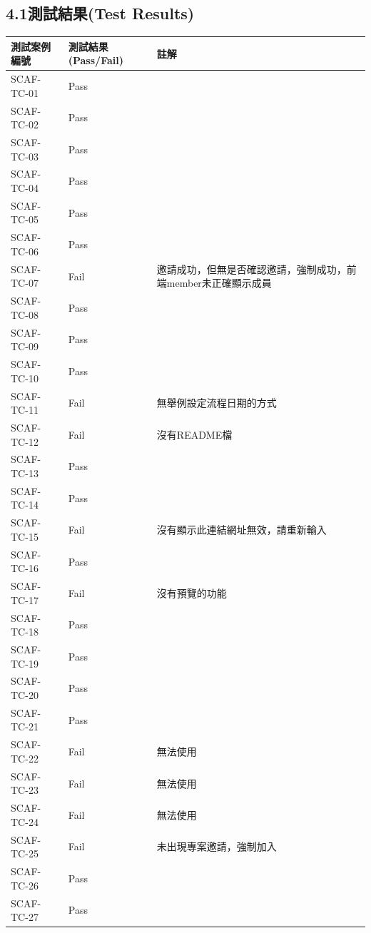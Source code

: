 \documentclass{report}
\begin{document}
\subsection*{4.1測試結果(Test Results)}
\begin{tabularx}{\textwidth}{
  |p{}%
  |p{}%
  |p{}|%
}
  \hline
  測試案例編號 & 測試結果(Pass/Fail) & 註解 \\ \hline
  SCAF-TC-01 & Pass &  \\ \hline
  SCAF-TC-02 & Pass &  \\ \hline
  SCAF-TC-03 & Pass &  \\ \hline
  SCAF-TC-04 & Pass &  \\ \hline
  SCAF-TC-05 & Pass &  \\ \hline
  SCAF-TC-06 & Pass &  \\ \hline
  SCAF-TC-07 & Fail &  邀請成功，但無是否確認邀請，強制成功，前端member未正確顯示成員 \\ \hline
  SCAF-TC-08 & Pass &  \\ \hline
  SCAF-TC-09 & Pass &  \\ \hline
  SCAF-TC-10 & Pass &  \\ \hline
  SCAF-TC-11 & Fail &  無舉例設定流程日期的方式 \\ \hline
  SCAF-TC-12 & Fail &  沒有README檔 \\ \hline
  SCAF-TC-13 & Pass &  \\ \hline
  SCAF-TC-14 & Pass &  \\ \hline
  SCAF-TC-15 & Fail &  沒有顯示此連結網址無效，請重新輸入 \\ \hline
  SCAF-TC-16 & Pass &  \\ \hline
  SCAF-TC-17 & Fail &  沒有預覽的功能 \\ \hline
  SCAF-TC-18 & Pass &  \\ \hline
  SCAF-TC-19 & Pass &  \\ \hline
  SCAF-TC-20 & Pass &  \\ \hline
  SCAF-TC-21 & Pass &  \\ \hline
  SCAF-TC-22 & Fail & 無法使用 \\ \hline
  SCAF-TC-23 & Fail & 無法使用 \\ \hline
  SCAF-TC-24 & Fail & 無法使用\\ \hline
  SCAF-TC-25 & Fail & 未出現專案邀請，強制加入 \\ \hline
  SCAF-TC-26 & Pass &  \\ \hline
  SCAF-TC-27 & Pass &  \\ \hline
\end{tabularx}
\\
\newline
\\
\end{document}
